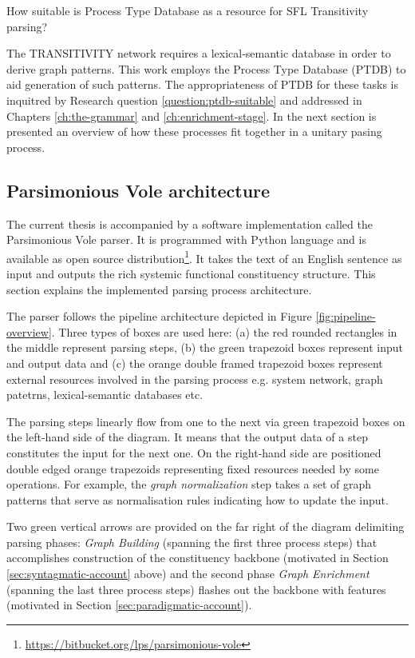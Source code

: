\begin{question}\label{question:ptdb-suitable}
    How suitable is Process Type Database as a resource for SFL Transitivity parsing? 
\end{question}


The TRANSITIVITY network requires a lexical-semantic database in order to derive graph patterns. This work employs the Process Type Database (PTDB) \citep{Neale2002} to aid generation of such patterns. The appropriateness of PTDB for these tasks is inquitred by Research question \ref{question:ptdb-suitable} and addressed in Chapters \ref{ch:the-grammar} and \ref{ch:enrichment-stage}. In the next section is presented an overview of how these processes fit together in a unitary pasing process.

\subsection{Parsimonious Vole architecture}
\label{sec:architecture}
The current thesis is accompanied by a software implementation called the Parsimonious Vole parser. It is programmed with Python language and is available as open source distribution\footnote{\url{https://bitbucket.org/lps/parsimonious-vole}}. It takes the text of an English sentence as input and outputs the rich systemic functional constituency structure. This section explains the implemented parsing process architecture.

The parser follows the pipeline architecture depicted in Figure \ref{fig:pipeline-overview}. Three types of boxes are used here: (a) the red rounded rectangles in the middle represent parsing steps, (b) the green trapezoid boxes represent input and output data and (c) the orange double framed trapezoid boxes represent external resources involved in the parsing process e.g. system network, graph patetrns, lexical-semantic databases etc. 

The parsing steps linearly flow from one to the next via green trapezoid boxes on the left-hand side of the diagram. It means that the output data of a step constitutes the input for the next one. On the right-hand side are positioned double edged orange trapezoids representing fixed resources needed by some operations. For example, the \textit{graph normalization} step takes a set of graph patterns that serve as normalisation rules indicating how to update the input.

Two green vertical arrows are provided on the far right of the diagram delimiting parsing phases: \textit{Graph Building} (spanning the first three process steps) that accomplishes construction of the constituency backbone (motivated in Section \ref{sec:syntagmatic-account} above) and the second phase \textit{Graph Enrichment} (spanning the last three process steps) flashes out the backbone with features (motivated in Section \ref{sec:paradigmatic-account}).

